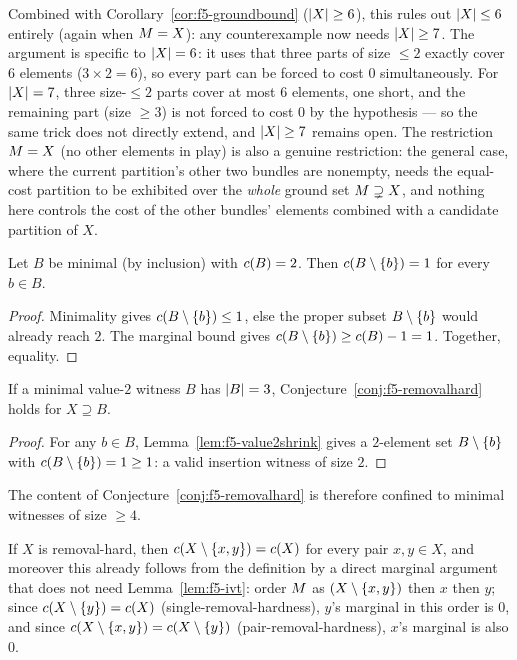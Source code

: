 Combined with Corollary~\ref{cor:f5-groundbound} ($\left\lvert X\right\rvert \ge 6$), this rules
out $\left\lvert X\right\rvert \le 6$ entirely (again when $M = X$): any counterexample now
needs $\left\lvert X\right\rvert \ge 7$. The argument is specific to $\left\lvert X\right\rvert = 6$: it uses that
three parts of size $\le 2$ exactly cover $6$ elements
($3 \times 2 = 6$), so every part can be forced to cost $0$ simultaneously.
For $\left\lvert X\right\rvert = 7$, three size-$\le 2$ parts cover at most $6$ elements, one
short, and the remaining part (size $\ge 3$) is not forced to cost $0$ by the
hypothesis --- so the same trick does not directly extend, and $\left\lvert X\right\rvert \ge 7$
remains open. The restriction $M = X$ (no other elements in play) is
also a genuine restriction: the general case, where the current partition's
other two bundles are nonempty, needs the equal-cost partition to be
exhibited over the \emph{whole} ground set $M \supsetneq X$, and nothing
here controls the cost of the other bundles' elements combined with a
candidate partition of $X$.

\begin{lemma}
\label{lem:f5-value2shrink}
Let $B$ be minimal (by inclusion) with $c(B) = 2$. Then
$c(B \setminus \left\{b\right\}) = 1$ for every $b \in B$.
\end{lemma}

\begin{proof}
Minimality gives $c(B \setminus \left\{b\right\}) \le 1$, else the proper subset
$B \setminus \left\{b\right\}$ would already reach $2$. The marginal bound gives
$c(B \setminus \left\{b\right\}) \ge c(B) - 1 = 1$. Together, equality.
\end{proof}

\begin{corollary}
\label{cor:f5-witness3}
If a minimal value-$2$ witness $B$ has $\left\lvert B\right\rvert = 3$, Conjecture~\ref{conj:f5-removalhard} holds for $X \supseteq B$.
\end{corollary}

\begin{proof}
For any $b \in B$, Lemma~\ref{lem:f5-value2shrink} gives a $2$-element set
$B \setminus \left\{b\right\}$ with $c(B \setminus \left\{b\right\}) = 1 \ge 1$: a valid
insertion witness of size $2$.
\end{proof}

The content of Conjecture~\ref{conj:f5-removalhard} is therefore confined to
minimal witnesses of size $\ge 4$.

\begin{lemma}
\label{lem:f5-pairfull}
If $X$ is removal-hard, then $c(X \setminus \left\{x,y\right\}) = c(X)$ for
every pair $x, y \in X$, and moreover this already follows from the definition
by a direct marginal argument that does not need Lemma~\ref{lem:f5-ivt}: order
$M$ as $(X \setminus \left\{x,y\right\})$ then $x$ then $y$; since
$c(X \setminus \left\{y\right\}) = c(X)$ (single-removal-hardness), $y$'s
marginal in this order is $0$, and since
$c(X \setminus \left\{x,y\right\}) = c(X \setminus \left\{y\right\})$
(pair-removal-hardness), $x$'s marginal is also $0$.
\end{lemma}


